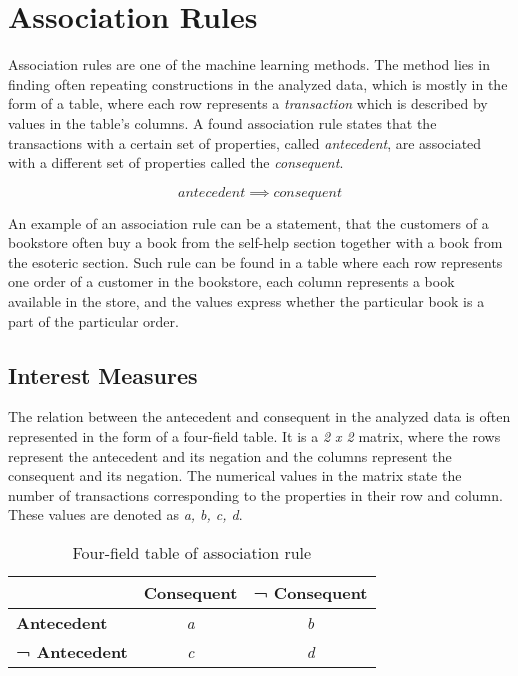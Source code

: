 \chapter{Association Rules\label{assocrules}}

Association rules are one of the machine learning methods. The method lies in finding often repeating constructions in the analyzed data, which is mostly in the form of a table, where each row represents a \textit{transaction} which is described by values in the table's columns.\cite{Agrawal1993} A found association rule states that the transactions with a certain set of properties, called \textit{antecedent}, are associated with a different set of properties called the \textit{consequent}. 

$$
antecedent \implies consequent
$$

An example of an association rule can be a statement, that the customers of a bookstore often buy a book from the self-help section together with a book from the esoteric section. Such rule can be found in a table where each row represents one order of a customer in the bookstore, each column represents a book available in the store, and the values express whether the particular book is a part of the particular order.

\section{Interest Measures}

The relation between the antecedent and consequent in the analyzed data is often represented in the form of a four-field table. It is a \textit{2 x 2} matrix, where the rows represent the antecedent and its negation and the columns represent the consequent and its negation. The numerical values in the matrix state the number of transactions corresponding to the properties in their row and column. These values are denoted as \textit{a, b, c, d}.

\begin{table}[htbp]
\begin{center}
\begin{tabular}{l|c|c}
& \multicolumn{1}{l|}{\textbf{Consequent}} & \multicolumn{1}{l}{\textbf{¬ Consequent}} \\ \hline
\textbf{Antecedent} & \textit{a} & \textit{b} \\ \hline
\textbf{¬ Antecedent} & \textit{c} & \textit{d}
\end{tabular}
\end{center}
\caption{Four-field table of association rule}
\label{4ft}
\end{table}

